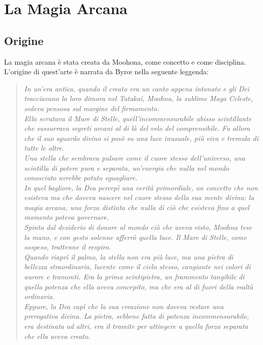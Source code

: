 \documentclass[10pt, a4paper]{report}
\begin{document}
\chapter{La Magia Arcana}

\begin{multicols}{2}

\section{Origine} 
La magia arcana è stata creata da Moohona, come concetto e come disciplina. L'origine di quest'arte è narrata da Byrœ nella seguente leggenda:

\begin{verse}
	
\textit{In un'era antica, quando il creato era un canto appena intonato e gli Dei tracciavano la loro dimora nel Tatakai, Moohna, la sublime Maga Celeste, sedeva pensosa sul margine del firmamento.\\ Ella scrutava il Mare di Stelle, quell’incommensurabile abisso scintillante che sussurrava segreti arcani al di là del velo del comprensibile.
Fu allora che il suo sguardo divino si posò su una luce inusuale, più viva e tremula di tutte le altre.\\ Una stella che sembrava pulsare come il cuore stesso dell'universo, una scintilla di potere pura e separata, un'energia che nulla nel mondo conosciuto avrebbe potuto eguagliare.\\ In quel bagliore, la Dea percepì una verità primordiale, un concetto che non esisteva ma che doveva nascere nel cuore stesso della sua mente divina: la magia arcana, una forza distinta che nulla di ciò che esisteva fino a quel momento poteva governare.\\ Spinta dal desiderio di donare al mondo ciò che aveva visto, Moohna tese la mano, e con gesto solenne afferrò quella luce. Il Mare di Stelle, come sospeso, trattenne il respiro.\\ Quando riaprì il palmo, la stella non era più luce, ma una pietra di bellezza straordinaria, lucente come il cielo stesso, cangiante nei colori di aurore e tramonti. Era la prima scintipietra, un frammento tangibile di quella potenza che ella aveva concepito, ma che era al di fuori della realtà ordinaria.\\
Eppure, la Dea capì che la sua creazione non doveva restare una prerogativa divina. La pietra, sebbene fatta di potenza incommensurabile, era destinata ad altri, era il tramite per attingere a quella forza separata che ella aveva creato.}

\end{verse}
\end{multicols}
\end{document}
